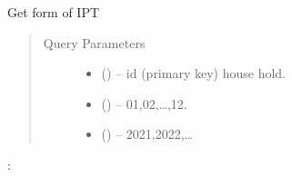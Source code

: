 \documentclass[letterpaper,10pt,english,openany,oneside]{sphinxmanual}
\begin{document}
\begin{fulllineitems}
\label{\detokenize{api-last-mile/v1:get--api-last-smile-v1-IPT-form}}
\sphinxAtStartPar
Get form of IPT
\begin{quote}\begin{description}
\item[{Query Parameters}] \leavevmode\begin{itemize}
\item {} 
\sphinxAtStartPar
{} () – id (primary key) house hold.

\item {} 
\sphinxAtStartPar
{} () – 01,02,…,12.

\item {} 
\sphinxAtStartPar
{} () – 2021,2022,…

\end{itemize}

\end{description}\end{quote}

\sphinxAtStartPar
{}:


\end{fulllineitems}
\end{document}
